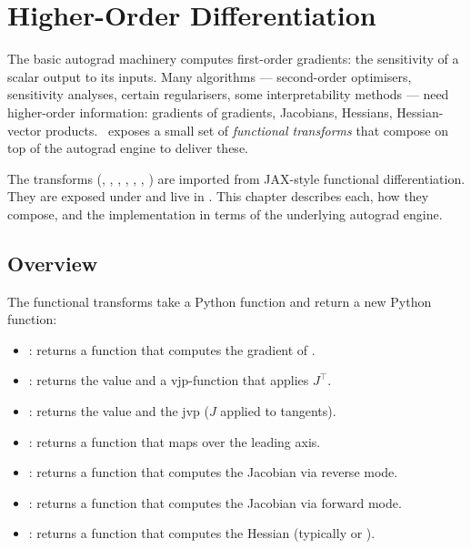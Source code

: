 \chapter{Higher-Order Differentiation}
\label{ch:higher_order}

The basic autograd machinery computes first-order gradients: the
sensitivity of a scalar output to its inputs. Many algorithms ---
second-order optimisers, sensitivity analyses, certain
regularisers, some interpretability methods --- need higher-order
information: gradients of gradients, Jacobians, Hessians,
Hessian-vector products. \Lucid\ exposes a small set of
\emph{functional transforms} that compose on top of the autograd
engine to deliver these.

The transforms (, , , ,
, , ) are imported from
JAX-style functional differentiation. They are exposed under
 and live in . This chapter
describes each, how they compose, and the implementation in terms
of the underlying autograd engine.

\section{Overview}
\label{sec:higher_order:overview}

The functional transforms take a Python function and return a
new Python function:

\begin{itemize}
  \item {}: returns a function that computes the
    gradient of .
  \item {}: returns the value and a
    vjp-function that applies $J^\top$.
  \item {}: returns the value and
    the jvp ($J$ applied to tangents).
  \item {}: returns a function that maps over the
    leading axis.
  \item {}: returns a function that computes the
    Jacobian via reverse mode.
  \item {}: returns a function that computes the
    Jacobian via forward mode.
  \item {}: returns a function that computes the
    Hessian (typically  or
    ).
\end{itemize}

